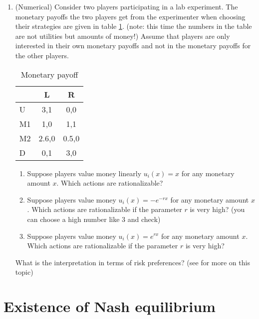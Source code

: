 \documentclass[a4paper,12pt]{article}
\begin{document}
\begin{enumerate}
\item (Numerical) Consider two players participating in a lab experiment. The monetary payoffs the two players get from the experimenter when choosing their strategies are given in table \ref{tab:monRatio}. (note: this time the numbers in the table are not utilities but amounts of money!) Assume that players are only interested in their own monetary payoffs and not in the monetary payoffs for the other players.
  \begin{table}[h]
    \centering
    \begin{tabular}{l|c|c}
      & L &R\\ \hline
      U& 3,1  &0,0  \\
      M1&1,0&1,1 \\
      M2&2.6,0  &0.5,0 \\
      D& 0,1 & 3,0
    \end{tabular}
    \caption{Monetary payoff}
    \label{tab:monRatio}
  \end{table}
  \begin{enumerate}
  \item Suppose players value money linearly $u_i(x)=x$ for any monetary amount $x$. Which actions are rationalizable?
  \item Suppose players value money  $u_i(x)=-e^{-r x}$ for any monetary amount $x$. Which actions are rationalizable if the parameter $r$ is very high? (you can choose a high number like $3$ and check)
     \item Suppose players value money $u_i(x)=e^{r x}$ for any monetary amount $x$. Which actions are rationalizable if the parameter $r$ is very high?
     \end{enumerate}
     What is the interpretation in terms of risk preferences? (see \cite{weinstein2016effect} for more on this topic)
\end{enumerate}


\section{Existence of Nash equilibrium}
\label{sec:nash-theorem-fixed}
\end{document}
